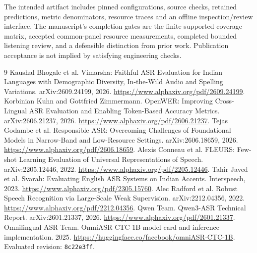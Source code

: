 \documentclass[11pt]{article}
\begin{document}
The intended artifact includes pinned configurations, source checks, retained predictions, metric denominators, resource traces and an offline inspection/review interface. The manuscript's completion gates are the finite supported coverage matrix, accepted common-panel resource measurements, completed bounded listening review, and a defensible distinction from prior work. Publication acceptance is not implied by satisfying engineering checks.

\begin{thebibliography}{9}
 Kaushal Bhogale et al. Vimarsha: Faithful ASR Evaluation for Indian Languages with Demographic Diversity, In-the-Wild Audio and Spelling Variations. arXiv:2609.24199, 2026. \url{https://www.alphaxiv.org/pdf/2609.24199}.
 Korbinian Kuhn and Gottfried Zimmermann. OpenWER: Improving Cross-Lingual ASR Evaluation and Enabling Token-Based Accuracy Metrics. arXiv:2606.21237, 2026. \url{https://www.alphaxiv.org/pdf/2606.21237}.
 Tejas Godambe et al. Responsible ASR: Overcoming Challenges of Foundational Models in Narrow-Band and Low-Resource Settings. arXiv:2606.18659, 2026. \url{https://www.alphaxiv.org/pdf/2606.18659}.
 Alexis Conneau et al. FLEURS: Few-shot Learning Evaluation of Universal Representations of Speech. arXiv:2205.12446, 2022. \url{https://www.alphaxiv.org/pdf/2205.12446}.
 Tahir Javed et al. Svarah: Evaluating English ASR Systems on Indian Accents. Interspeech, 2023. \url{https://www.alphaxiv.org/pdf/2305.15760}.
 Alec Radford et al. Robust Speech Recognition via Large-Scale Weak Supervision. arXiv:2212.04356, 2022. \url{https://www.alphaxiv.org/pdf/2212.04356}.
 Qwen Team. Qwen3-ASR Technical Report. arXiv:2601.21337, 2026. \url{https://www.alphaxiv.org/pdf/2601.21337}.
 Omnilingual ASR Team. OmniASR-CTC-1B model card and inference implementation. 2025. \url{https://huggingface.co/facebook/omniASR-CTC-1B}. Evaluated revision: \texttt{8c22e3ff}.
\end{thebibliography}
\end{document}
